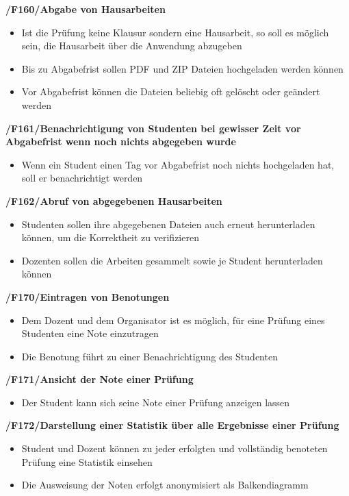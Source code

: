 \documentclass[12pt, a4paper]{scrartcl}
\newcommand{\ford}[2]{\textbf{/#1/\hspace{2em}#2}}
\begin{document}
\ford{F160}{Abgabe von Hausarbeiten}
\begin{itemize}
	\item Ist die Prüfung keine Klausur sondern eine Hausarbeit, so soll es möglich sein, die Hausarbeit über die Anwendung abzugeben
	\item Bis zu Abgabefrist sollen PDF und ZIP Dateien hochgeladen werden können
	\item Vor Abgabefrist können die Dateien beliebig oft gelöscht oder geändert werden
\end{itemize}

\ford{F161}{Benachrichtigung von Studenten bei gewisser Zeit vor Abgabefrist wenn noch nichts abgegeben wurde}
\begin{itemize}
	\item Wenn ein Student einen Tag vor Abgabefrist noch nichts hochgeladen hat, soll er benachrichtigt werden
\end{itemize}

\ford{F162}{Abruf von abgegebenen Hausarbeiten}
\begin{itemize}
	\item Studenten sollen ihre abgegebenen Dateien auch erneut herunterladen können, um die Korrektheit zu verifizieren
	\item Dozenten sollen die Arbeiten gesammelt sowie je Student herunterladen können
\end{itemize}

\ford{F170}{Eintragen von Benotungen}
\begin{itemize}
	\item Dem Dozent und dem Organisator ist es möglich, für eine Prüfung eines Studenten eine Note einzutragen
	\item Die Benotung führt zu einer Benachrichtigung des Studenten
\end{itemize}

\ford{F171}{Ansicht der Note einer Prüfung}
\begin{itemize}
	\item Der Student kann sich seine Note einer Prüfung anzeigen lassen
\end{itemize}

\ford{F172}{Darstellung einer Statistik über alle Ergebnisse einer Prüfung}
\begin{itemize}
	\item Student und Dozent können zu jeder erfolgten und vollständig benoteten Prüfung eine Statistik einsehen
	\item Die Ausweisung der Noten erfolgt anonymisiert als Balkendiagramm
\end{itemize}
\end{document}
